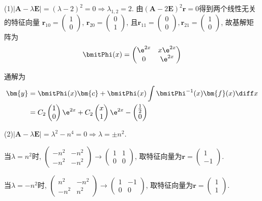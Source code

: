 \begin{solve}
(1)$|\bm{A}-\lambda\bm{E}|=(\lambda-2)^2=0\Rightarrow\lambda_{1,2}=2$. 
由$(\bm{A}-2\bm{E})^2\bm{r}=0$得到两个线性无关的特征向量
$\bm{r}_{10}=\begin{pmatrix}1\\0\end{pmatrix}$,
$\bm{r}_{20}=\begin{pmatrix}0\\1\end{pmatrix}$, 
且$\bm{r}_{11}=\begin{pmatrix}0\\0\end{pmatrix},\bm{r}_{21}=\begin{pmatrix}1\\0\end{pmatrix}$, 故基解矩阵为
\[\bmitPhi(x)=\begin{pmatrix}\e^{2x}&x\e^{2x}\\0&\e^{2x}\end{pmatrix}\]

通解为\[\begin{split}\bm{y}
&=\bmitPhi(x)\bm{c}+\bmitPhi(x)\int\bmitPhi^{-1}(x)\bm{f}(x)\diff x\\
&=C_2\begin{pmatrix}1\\0\end{pmatrix}\e^{2x}+C_2\begin{pmatrix}x\\1\end{pmatrix}\e^{2x}-\begin{pmatrix}\frac{1}{2}\\0\end{pmatrix}
\end{split}\]

(2)$|\bm{A}-\lambda\bm{E}|=\lambda^2-n^4=0\Rightarrow\lambda=\pm n^2$.

当$\lambda=n^2$时, $\begin{pmatrix}-n^2&-n^2\\-n^2&-n^2\end{pmatrix}\to\begin{pmatrix}1&1\\0&0\end{pmatrix}$, 
取特征向量为$\bm{r}=\begin{pmatrix}1\\-1\end{pmatrix}$.

当$\lambda=-n^2$时, $\begin{pmatrix}n^2&-n^2\\-n^2&n^2\end{pmatrix}\to\begin{pmatrix}1&-1\\0&0\end{pmatrix}$,
取特征向量为$\bm{r}=\begin{pmatrix}1\\1\end{pmatrix}$.


\end{solve}
